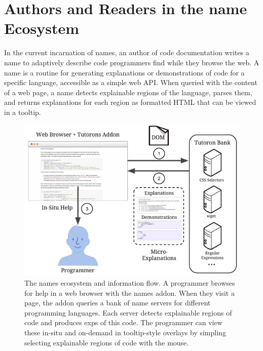 \section{Authors and Readers in the \Gls{name} Ecosystem}

In the current incarnation of \glspl{name}, an author of code documentation writes a \gls{name} to adaptively describe  code programmers find while they browse the web.
A \gls{name} is a routine for generating explanations or demonstrations of code for a specific language, accessible as a simple web API\@.
When queried with the content of a web page, a \gls{name} detects explainable regions of the language, parses them, and returns explanations for each region as formatted HTML that can be viewed in a tooltip.

\begin{figure}
    \includegraphics[width=\columnwidth]{figures/tutoron_ecosystem}
    \caption{%
    The \Glspl{name} ecosystem and information flow.
    A programmer browses for help in a web browser with the \Glspl{name} addon.
    When they visit a page, the addon queries a bank of \gls{name} servers for different programming languages.
    Each server detects explainable regions of code and produces \glspl{exp} of this code.
    The programmer can view these in-situ and on-demand in tooltip-style overlays by simpling selecting explainable regions of code with the mouse.
    }\label{fig:tutoron_ecosystem}
\end{figure}


